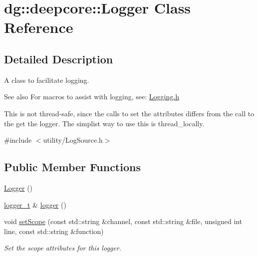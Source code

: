 \hypertarget{classdg_1_1deepcore_1_1_logger}{}\section{dg\+:\+:deepcore\+:\+:Logger Class Reference}
\label{classdg_1_1deepcore_1_1_logger}


\subsection{Detailed Description}
A class to facilitate logging. 

\begin{DoxySeeAlso}{See also}
For macros to assist with logging, see\+: \hyperlink{_logging_8h_source}{Logging.\+h}
\end{DoxySeeAlso}
This is not thread-\/safe, since the calls to set the attributes differs from the call to the get the logger. The simplist way to use this is thread\+\_\+locally. 

{\ttfamily \#include $<$utility/\+Log\+Source.\+h$>$}

\subsection*{Public Member Functions}
\begin{DoxyCompactItemize}
\item 
\hyperlink{classdg_1_1deepcore_1_1_logger_ad757afdbd753af92bb9858dbf868746c}{Logger} ()
\item 
\hyperlink{namespacedg_1_1deepcore_acaeda2fb8a475fd1de2ef14ac9ec7a2f}{logger\+\_\+t} \& \hyperlink{classdg_1_1deepcore_1_1_logger_abe36ca0960079ec47a53414d1a0d4e11}{logger} ()
\item 
void \hyperlink{classdg_1_1deepcore_1_1_logger_ad3fab1d86034c5eb5d76ac54668890d8}{set\+Scope} (const std\+::string \&channel, const std\+::string \&file, unsigned int line, const std\+::string \&function)
\begin{DoxyCompactList}\small\item\em Set the scope attributes for this logger. \end{DoxyCompactList}\end{DoxyCompactItemize}

